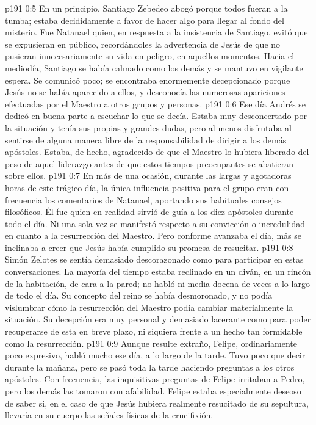 \vs p191 0:5 En un principio, Santiago Zebedeo abogó porque todos fueran a la tumba; estaba decididamente a favor de hacer algo para llegar al fondo del misterio. Fue Natanael quien, en respuesta a la insistencia de Santiago, evitó que se expusieran en público, recordándoles la advertencia de Jesús de que no pusieran innecesariamente su vida en peligro, en aquellos momentos. Hacia el mediodía, Santiago se había calmado como los demás y se mantuvo en vigilante espera. Se comunicó poco; se encontraba enormemente decepcionado porque Jesús no se había aparecido a ellos, y desconocía las numerosas apariciones efectuadas por el Maestro a otros grupos y personas.
\vs p191 0:6 Ese día Andrés se dedicó en buena parte a escuchar lo que se decía. Estaba muy desconcertado por la situación y tenía sus propias y grandes dudas, pero al menos disfrutaba al sentirse de alguna manera libre de la responsabilidad de dirigir a los demás apóstoles. Estaba, de hecho, agradecido de que el Maestro lo hubiera liberado del peso de aquel liderazgo antes de que estos tiempos preocupantes se abatieran sobre ellos.
\vs p191 0:7 En más de una ocasión, durante las largas y agotadoras horas de este trágico día, la única influencia positiva para el grupo eran con frecuencia los comentarios de Natanael, aportando sus habituales consejos filosóficos. Él fue quien en realidad sirvió de guía a los diez apóstoles durante todo el día. Ni una sola vez se manifestó respecto a su convicción o incredulidad en cuanto a la resurrección del Maestro. Pero conforme avanzaba el día, más se inclinaba a creer que Jesús había cumplido su promesa de resucitar.
\vs p191 0:8 Simón Zelotes se sentía demasiado descorazonado como para participar en estas conversaciones. La mayoría del tiempo estaba reclinado en un diván, en un rincón de la habitación, de cara a la pared; no habló ni media docena de veces a lo largo de todo el día. Su concepto del reino se había desmoronado, y no podía vislumbrar cómo la resurrección del Maestro podía cambiar materialmente la situación. Su decepción era muy personal y demasiado lacerante como para poder recuperarse de esta en breve plazo, ni siquiera frente a un hecho tan formidable como la resurrección.
\vs p191 0:9 Aunque resulte extraño, Felipe, ordinariamente poco expresivo, habló mucho ese día, a lo largo de la tarde. Tuvo poco que decir durante la mañana, pero se pasó toda la tarde haciendo preguntas a los otros apóstoles. Con frecuencia, las inquisitivas preguntas de Felipe irritaban a Pedro, pero los demás las tomaron con afabilidad. Felipe estaba especialmente deseoso de saber si, en el caso de que Jesús hubiera realmente resucitado de su sepultura, llevaría en su cuerpo las señales físicas de la crucifixión.
